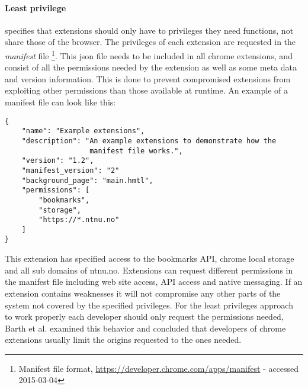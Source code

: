 \paragraph{Least privilege} specifies that extensions should only have to privileges they need functions, not share those of the browser. The privileges of each extension are requested in the \emph{manifest} file \footnote{Manifest file format, \url{https://developer.chrome.com/apps/manifest} - accessed 2015-03-04}. This json file needs to be included in all chrome extensions, and consist of all the permissions needed by the extension as well as some meta data and version information. This is done to prevent compromised extensions from exploiting other permissions than those available at runtime. An example of a manifest file can look like this: 

\begin{verbatim}
{
    "name": "Example extensions",
    "description": "An example extensions to demonstrate how the
                    manifest file works.",
    "version": "1.2",
    "manifest_version": "2"
    "background_page": "main.hmtl",
    "permissions": [
        "bookmarks",
        "storage",
        "https://*.ntnu.no"
    ]
}
\end{verbatim}
This extension has specified access to the bookmarks API, chrome local storage and all sub domains of ntnu.no. Extensions can request different permissions in the manifest file including web site access, API access and native messaging. If an extension contains weaknesses it will not compromise any other parts of the system not covered by the specified privileges. For the least privileges approach to work properly each developer should only request the permissions needed, Barth et al. \cite{protecting-browsers} examined this behavior and concluded that developers of chrome extensions usually limit the origins requested to the ones needed. 

